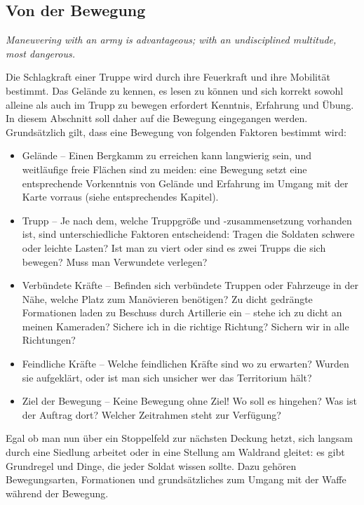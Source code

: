 \newpage
\subsection{Von der Bewegung}
\centerline{\textit{Maneuvering with an army is advantageous; with an undisciplined multitude, most dangerous.}}
Die Schlagkraft einer Truppe wird durch ihre Feuerkraft und ihre Mobilität bestimmt. Das Gelände zu kennen, es lesen zu können und sich korrekt sowohl alleine als auch im Trupp zu bewegen erfordert Kenntnis, Erfahrung und Übung. In diesem Abschnitt soll daher auf die Bewegung eingegangen werden.
\\Grundsätzlich gilt, dass eine Bewegung von folgenden Faktoren bestimmt wird:
\begin{itemize}
	\item Gelände -- Einen Bergkamm zu erreichen kann langwierig sein, und weitläufige freie Flächen sind zu meiden: eine Bewegung setzt eine entsprechende Vorkenntnis von Gelände und Erfahrung im Umgang mit der Karte vorraus (siehe entsprechendes Kapitel).
	\item Trupp -- Je nach dem, welche Truppgröße und -zusammensetzung vorhanden ist, sind unterschiedliche Faktoren entscheidend: Tragen die Soldaten schwere oder leichte Lasten? Ist man zu viert oder sind es zwei Trupps die sich bewegen? Muss man Verwundete verlegen? 
	\item Verbündete Kräfte -- Befinden sich verbündete Truppen oder Fahrzeuge in der Nähe, welche Platz zum Manövieren benötigen? Zu dicht gedrängte Formationen laden zu Beschuss durch Artillerie ein -- stehe ich zu dicht an meinen Kameraden? Sichere ich in die richtige Richtung? Sichern wir in alle Richtungen?
	\item Feindliche Kräfte -- Welche feindlichen Kräfte sind wo zu erwarten? Wurden sie aufgeklärt, oder ist man sich unsicher wer das Territorium hält?
	\item Ziel der Bewegung -- Keine Bewegung ohne Ziel! Wo soll es hingehen? Was ist der Auftrag dort? Welcher Zeitrahmen steht zur Verfügung?
\end{itemize}
Egal ob man nun über ein Stoppelfeld zur nächsten Deckung hetzt, sich langsam durch eine Siedlung arbeitet oder in eine Stellung am Waldrand gleitet: es gibt Grundregel und Dinge, die jeder Soldat wissen sollte. Dazu gehören Bewegungsarten, Formationen und grundsätzliches zum Umgang mit der Waffe während der Bewegung.
